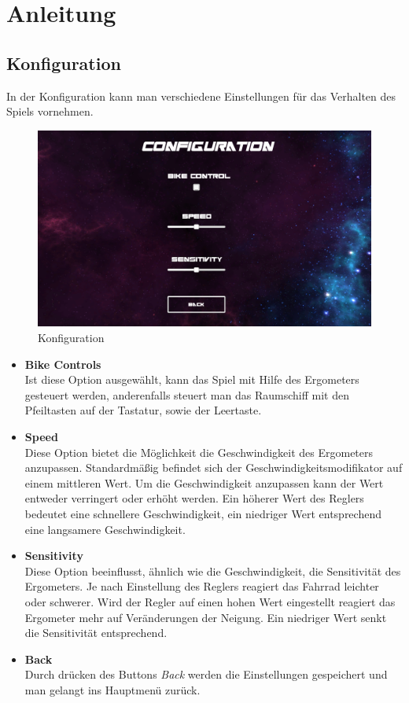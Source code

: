 \chapter{Anleitung}
\label{Anleitung}

\section{Konfiguration}
In der Konfiguration kann man verschiedene Einstellungen für das Verhalten des Spiels vornehmen.

\begin{figure}[h]
  \begin{center}
    \includegraphics[width=.9\textwidth]{gfx/anleitung/config.png}
    \caption{Konfiguration}
  \end{center}
\end{figure}

\begin{itemize}
  \item \textbf{Bike Controls} \\
  Ist diese Option ausgewählt, kann das Spiel mit Hilfe des Ergometers gesteuert werden, anderenfalls steuert man das Raumschiff mit den Pfeiltasten auf der Tastatur, sowie der Leertaste.
  \item \textbf{Speed} \\
  Diese Option bietet die Möglichkeit die Geschwindigkeit des Ergometers anzupassen. Standardmäßig befindet sich der Geschwindigkeitsmodifikator auf einem mittleren Wert. Um die Geschwindigkeit anzupassen kann der Wert entweder verringert oder erhöht werden. Ein höherer Wert des Reglers bedeutet eine schnellere Geschwindigkeit, ein niedriger Wert entsprechend eine langsamere Geschwindigkeit.
  \item \textbf{Sensitivity}\\
   Diese Option beeinflusst, ähnlich wie die Geschwindigkeit, die Sensitivität des Ergometers. Je nach Einstellung des Reglers reagiert das Fahrrad leichter oder schwerer. Wird der Regler auf einen hohen Wert eingestellt reagiert das Ergometer mehr auf Veränderungen der Neigung. Ein niedriger Wert senkt die Sensitivität entsprechend.
  \item \textbf{Back} \\
  Durch drücken des Buttons \textit{Back} werden die Einstellungen gespeichert und man gelangt ins Hauptmenü zurück.
\end{itemize}

